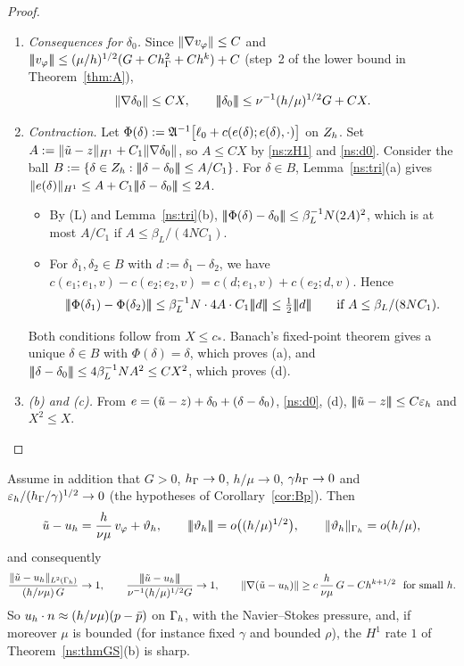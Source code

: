 \begin{proof}
\begin{enumerate}
\[
\tnorm r\le C\beta_L^{-1}\bigl(h/\mu+\hG^{3/2}+\eps\bigr).
\]
\item \emph{Consequences for $\delta_0$.} Since $\lVert \nabla v_\varphi\rVert\le C$ and $|\!|\!|v_\varphi|\!|\!|\le(\mu/h)^{1/2}(G+Ch_\Gamma^2+Ch^k)+C$ (step~2 of the lower bound in Theorem~\ref{thm:A}),
\begin{equation}\label{ns:d0}
\lVert \nabla\delta_0\rVert\le CX,\qquad |\!|\!|\delta_0|\!|\!|\le\nu^{-1}(h/\mu)^{1/2}G+CX .
\end{equation}
\item \emph{Contraction.} Let $\Phi(\delta):=\mathfrak A^{-1}\bigl[\ell_0+c(e(\delta);e(\delta),\cdot)\bigr]$ on $Z_h$. Set $A:=\lVert \tilde u-z\rVert_{H^1}+C_1\lVert \nabla\delta_0\rVert$, so $A\le CX$ by \eqref{ns:zH1} and \eqref{ns:d0}. Consider the ball $B:=\{\delta\in Z_h:|\!|\!|\delta-\delta_0|\!|\!|\le A/C_1\}$. For $\delta\in B$, Lemma~\ref{ns:tri}(a) gives $\lVert e(\delta)\rVert_{H^1}\le A+C_1|\!|\!|\delta-\delta_0|\!|\!|\le2A$.
\begin{itemize}
\item By (L) and Lemma~\ref{ns:tri}(b), $|\!|\!|\Phi(\delta)-\delta_0|\!|\!|\le\beta_L^{-1}N(2A)^2$, which is at most $A/C_1$ if $A\le\beta_L/(4NC_1)$.
\item For $\delta_1,\delta_2\in B$ with $d:=\delta_1-\delta_2$, we have $c(e_1;e_1,v)-c(e_2;e_2,v)=c(d;e_1,v)+c(e_2;d,v)$. Hence
\[
\tnorm{\Phi(\delta_1)-\Phi(\delta_2)}\le\beta_L^{-1}N\cdot4A\cdot C_1\tnorm d\le\tfrac12\tnorm d\qquad\text{if }A\le\beta_L/(8NC_1).
\]
\end{itemize}
Both conditions follow from $X\le c_\ast$. Banach's fixed-point theorem gives a unique $\delta\in B$ with $\Phi(\delta)=\delta$, which proves (a), and $|\!|\!|\delta-\delta_0|\!|\!|\le4\beta_L^{-1}NA^2\le CX^2$, which proves (d).
\item \emph{(b) and (c).} From $e=(\tilde u-z)+\delta_0+(\delta-\delta_0)$, \eqref{ns:d0}, (d), $|\!|\!|\tilde u-z|\!|\!|\le C\varepsilon_h$ and $X^2\le X$.\qedhere
\end{enumerate}
\end{proof}

\begin{corollary}\label{ns:Bp}
Assume in addition that $G>0$, $h_\Gamma\to0$, $h/\mu\to0$, $\gamma h_\Gamma\to0$ and $\varepsilon_h/(h_\Gamma/\gamma)^{1/2}\to0$ (the hypotheses of Corollary~\ref{cor:Bp}). Then
\[
\tilde u-u_h=\frac{h}{\nu\mu}\,v_\varphi+\vartheta_h,\qquad |\!|\!|\vartheta_h|\!|\!|=o\bigl((h/\mu)^{1/2}\bigr),\qquad\lVert \vartheta_h\rVert_{\Gamma_h}=o(h/\mu),
\]
and consequently
\[
\frac{\lVert \tilde u-u_h\rVert_{L^2(\Gamma_h)}}{(h/\nu\mu)\,G}\to1,\qquad
\frac{|\!|\!|\tilde u-u_h|\!|\!|}{\nu^{-1}(h/\mu)^{1/2}G}\to1,\qquad
\lVert \nabla(\tilde u-u_h)\rVert\ge c\,\frac{h}{\nu\mu}\,G-Ch^{k+1/2}\ \ \text{for small }h .
\]
So $u_h\cdot n\approx(h/\nu\mu)(p-\bar p)$ on $\Gamma_h$, with the Navier--Stokes pressure, and, if moreover $\mu$ is bounded (for instance fixed $\gamma$ and bounded $\rho$), the $H^1$ rate $1$ of Theorem~\ref{ns:thmGS}(b) is sharp.
\end{corollary}

